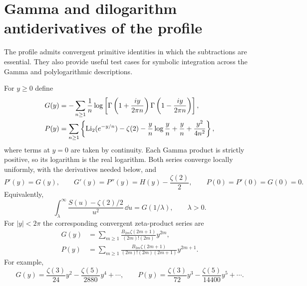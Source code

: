 \section{Gamma and dilogarithm antiderivatives of the profile}
\label{herg:sec:primitives}

The profile admits convergent primitive identities in which the
subtractions are essential. They also provide useful test cases for
symbolic integration across the Gamma and polylogarithmic descriptions.

\begin{theorem}
\label{herg:thm:primitives}
For $y\geq0$ define
\begin{align}
 G(y)&=-\sum_{n\geq1}\frac1n
   \log\left[\Gamma\left(1+\frac{iy}{2\pi n}\right)
             \Gamma\left(1-\frac{iy}{2\pi n}\right)\right],
 \label{herg:eq:Gprimitive}\\
 P(y)&=\sum_{n\geq1}\left\{
     \operatorname{Li}_2(e^{-y/n})-\zeta(2)-\frac yn\log\frac yn
                 +\frac yn+\frac{y^2}{4n^2}\right\},
 \label{herg:eq:Pprimitive}
\end{align}
where terms at $y=0$ are taken by continuity. Each Gamma product is
strictly positive, so its logarithm is the real logarithm. Both
series converge locally uniformly, with the derivatives needed below,
and
\begin{equation}\label{herg:eq:primitivechain}
 P'(y)=G(y),\qquad G'(y)=P''(y)=H(y)-\frac{\zeta(2)}2,
 \qquad P(0)=P'(0)=G(0)=0.
\end{equation}
Equivalently,
\begin{equation}\label{herg:eq:Gammameasureprimitive}
 \int_\lambda^\infty
     \frac{S(u)-\zeta(2)/2}{u^2}\,\dd u=G(1/\lambda),
 \qquad\lambda>0.
\end{equation}
For $|y|<2\pi$ the corresponding convergent zeta-product series are
\begin{align}
 G(y)&=\sum_{m\geq1}
  \frac{B_{2m}\zeta(2m+1)}{(2m)!(2m)}y^{2m},
 \label{herg:eq:Gseries}\\
 P(y)&=\sum_{m\geq1}
  \frac{B_{2m}\zeta(2m+1)}{(2m)!(2m)(2m+1)}y^{2m+1}.
 \label{herg:eq:Pseries}
\end{align}
For example,
\[
 G(y)=\frac{\zeta(3)}{24}y^2-\frac{\zeta(5)}{2880}y^4+\cdots,
 \qquad
 P(y)=\frac{\zeta(3)}{72}y^3-\frac{\zeta(5)}{14400}y^5+\cdots.
\]
\end{theorem}
